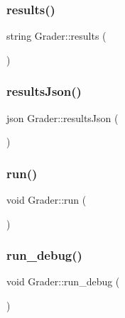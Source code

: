 \hypertarget{class_grader_a11aecee1c8a72a7251906df8532259b1}{}\label{class_grader_a11aecee1c8a72a7251906df8532259b1} 
\subsubsection{\texorpdfstring{results()}{results()}}
{\footnotesize\ttfamily string Grader\+::results (\begin{DoxyParamCaption}{ }\end{DoxyParamCaption})}

\hypertarget{class_grader_a0eb875277cac4c26fa67e5164caa3b38}{}\label{class_grader_a0eb875277cac4c26fa67e5164caa3b38} 
\subsubsection{\texorpdfstring{results\+Json()}{resultsJson()}}
{\footnotesize\ttfamily json Grader\+::results\+Json (\begin{DoxyParamCaption}{ }\end{DoxyParamCaption})}

\hypertarget{class_grader_a1c0d301659e72b58cc5214663f580c85}{}\label{class_grader_a1c0d301659e72b58cc5214663f580c85} 
\subsubsection{\texorpdfstring{run()}{run()}}
{\footnotesize\ttfamily void Grader\+::run (\begin{DoxyParamCaption}{ }\end{DoxyParamCaption})}

\hypertarget{class_grader_ac4cb9fc1094fea57d40c277f434d418d}{}\label{class_grader_ac4cb9fc1094fea57d40c277f434d418d} 
\subsubsection{\texorpdfstring{run\+\_\+debug()}{run\_debug()}}
{\footnotesize\ttfamily void Grader\+::run\+\_\+debug (\begin{DoxyParamCaption}{ }\end{DoxyParamCaption})}



